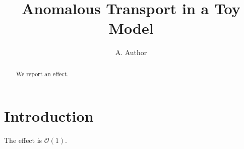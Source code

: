 \documentclass[aps,prl,twocolumn,superscriptaddress,floatfix]{revtex4-2}
\begin{document}
\title{Anomalous Transport in a Toy Model}
\author{A. Author}

\begin{abstract}
We report an effect.
\end{abstract}

\maketitle

\section{Introduction}
The effect is $\mathcal{O}(1)$.
\end{document}
